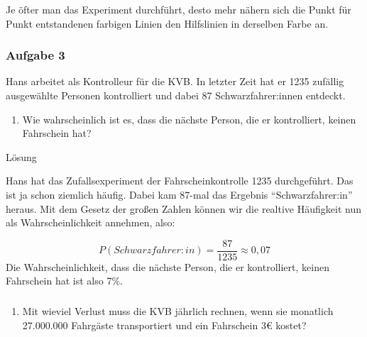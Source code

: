 \documentclass[
  ngerman,
]{book}
\providecommand{\tightlist}{%
  \setlength{\itemsep}{0pt}\setlength{\parskip}{0pt}}
\begin{document}
Je öfter man das Experiment durchführt, desto mehr nähern sich die Punkt für Punkt entstandenen farbigen Linien den Hilfslinien in derselben Farbe an.

\hypertarget{section-79}{%
\subsubsection*{}\label{section-79}}

\hypertarget{aufgabe-3-3}{%
\subsubsection*{Aufgabe 3}\label{aufgabe-3-3}}

Hans arbeitet als Kontrolleur für die KVB. In letzter Zeit hat er 1235 zufällig ausgewählte Personen kontrolliert und dabei 87 Schwarzfahrer:innen entdeckt.

\begin{enumerate}
\def\labelenumi{\alph{enumi})}
\tightlist
\item
  Wie wahrscheinlich ist es, dass die nächste Person, die er kontrolliert, keinen Fahrschein hat?
\end{enumerate}

Lösung

Hans hat das Zufallsexperiment der Fahrscheinkontrolle 1235 durchgeführt. Das ist ja schon ziemlich häufig. Dabei kam 87-mal das Ergebnis ``Schwarzfahrer:in'' heraus. Mit dem Gesetz der großen Zahlen können wir die realtive Häufigkeit nun als Wahrscheinlichkeit annehmen, also:

\[P(Schwarzfahrer:in)=\frac{87}{1235} \approx 0,07\]
Die Wahrscheinlichkeit, dass die nächste Person, die er kontrolliert, keinen Fahrschein hat ist also 7\%.

\hypertarget{section-80}{%
\subsubsection*{}\label{section-80}}

\begin{enumerate}
\def\labelenumi{\alph{enumi})}
\setcounter{enumi}{1}
\tightlist
\item
  Mit wieviel Verlust muss die KVB jährlich rechnen, wenn sie monatlich 27.000.000 Fahrgäste transportiert und ein Fahrschein 3€ kostet?
\end{enumerate}
\end{document}
